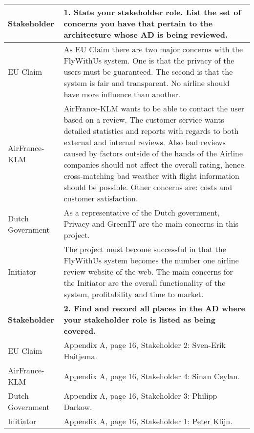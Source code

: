 \begin{longtable}{| l | p{13cm} |}
  \hline
  \textbf{Stakeholder} & \textbf{1. State your stakeholder role. List the set of concerns you have that pertain to the architecture whose AD is being reviewed.} \\
  \hline
  EU Claim & As EU Claim there are two major concerns with the FlyWithUs system. One is that the privacy of the users must be guaranteed. The second is that the system is fair and transparent. No airline should have more influence than another. \\
  \hline
  AirFrance-KLM & AirFrance-KLM wants to be able to contact the user based on a review. The customer service wants detailed statistics and reports with regards to both external and internal reviews. Also bad reviews caused by factors outside of the hands of the Airline companies should not affect the overall rating, hence cross-matching bad weather with flight information should be possible. Other concerns are: costs and customer satisfaction. \\
  \hline
  Dutch Government & As a representative of the Dutch government, Privacy and GreenIT are the main concerns in this project. \\
  \hline
  Initiator & The project must become successful in that the FlyWithUs system becomes the number one airline review website of the web. The main concerns for the Initiator are the overall functionality of the system, profitability and time to market. \\
  \hline

  \hline
  \textbf{Stakeholder} & \textbf{2. Find and record all places in the AD where your stakeholder role is listed as being covered.} \\
  \hline
  EU Claim & Appendix A, page 16, Stakeholder 2: Sven-Erik Haitjema. \\
  \hline
  AirFrance-KLM & Appendix A, page 16, Stakeholder 4: Sinan Ceylan. \\
  \hline
  Dutch Government & Appendix A, page 16, Stakeholder 3: Philipp Darkow. \\
  \hline
  Initiator & Appendix A, page 16, Stakeholder 1: Peter Klijn. \\
  \hline


\end{longtable}
